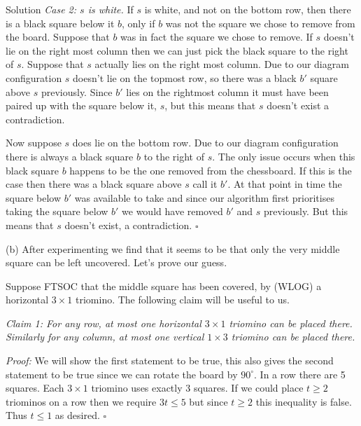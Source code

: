 \documentclass{article}
\begin{document}
\begin{solution}{Solution}
\textit{Case 2: $s$ is white.}
If $s$ is white, and not on the bottom row, then there is a black square
below it $b$, only if $b$ was not the square we chose to remove from the
board. Suppose that $b$ was in fact the square we chose to remove. If
$s$ doesn't lie on the right most column then we can just pick the black
square to the right of $s$. Suppose that $s$ actually lies on the right most
column. Due to our diagram configuration $s$ doesn't lie on the topmost
row, so there was a black $b'$ square above $s$ previously. Since $b'$
lies on the rightmost column it must have been paired up with the square
below it, $s$, but this means that $s$ doesn't exist a
contradiction. \vspace{0.2cm}

Now suppose $s$ does lie on the bottom row. Due to our diagram configuration
there is always a black square $b$ to the right of $s$. The only issue
occurs when this black square $b$ happens to be the one removed from the
chessboard. If this is the case then there was a black square above $s$
call it $b'$. At that point in time the square below $b'$ was available to
take and since our algorithm first prioritises taking the square below
$b'$ we would have removed $b'$ and $s$ previously. But this means that
$s$ doesn't exist, a contradiction. $\square$
\\ \bigskip

(b) After experimenting we find that it seems to be that only the
very middle square can be left uncovered. Let's prove our guess.
\vspace{0.2cm}

Suppose FTSOC that the middle square has been covered, by (WLOG) a
horizontal $3\times 1$ triomino. The following claim will be useful to us.
\vspace{0.2cm}

\textit{Claim 1: For any row, at most one horizontal $3\times 1$ triomino
can be placed there. Similarly for any column, at most one vertical
$1\times 3$ triomino can be placed there.}
\vspace{0.2cm}

\textit{Proof:} We will show the first statement to be true, this also
gives the second statement to be true since we can rotate the board by
$90^\circ$. In a row there are 5 squares. Each $3\times 1$ triomino uses
exactly 3 squares. If we could place $t \geq 2$ triominos on a row then
we require
$
3t \leq 5
$
but since $t \geq 2$ this inequality is false. Thus $t \leq 1$ as desired.
$\square$ \\


\end{solution}
\end{document}
